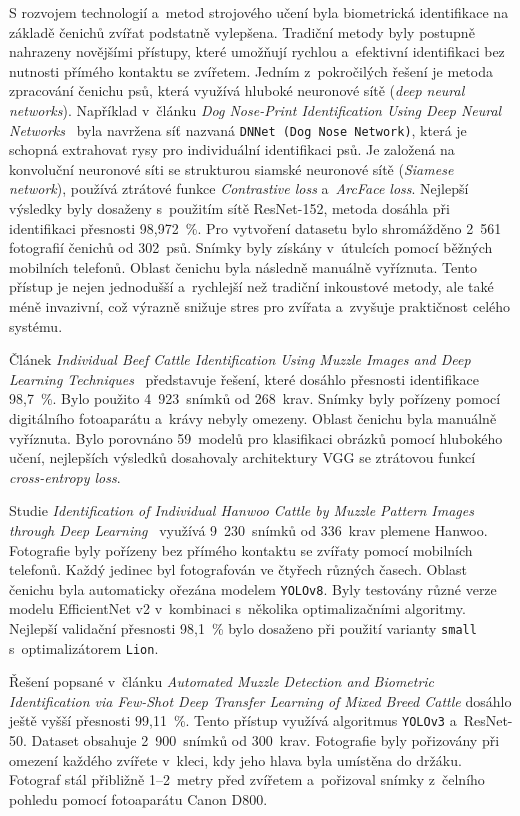 S rozvojem technologií a~metod strojového učení byla biometrická identifikace na základě čenichů zvířat podstatně vylepšena. Tradiční metody byly postupně nahrazeny novějšími přístupy, které umožňují rychlou a~efektivní identifikaci bez nutnosti přímého kontaktu se zvířetem. Jedním z~pokročilých řešení je metoda zpracování čenichu psů, která využívá hluboké neuronové sítě (\textit{deep neural networks}). Například v~článku \emph{Dog Nose-Print Identification Using Deep Neural Networks}~\cite{dog_nose_print} byla navržena síť nazvaná \texttt{DNNet (Dog Nose Network)}, která je schopná extrahovat rysy pro individuální identifikaci psů. Je založená na konvoluční neuronové síti se strukturou siamské neuronové sítě (\textit{Siamese network}), používá ztrátové funkce \textit{Contrastive loss} a~\textit{ArcFace loss}. Nejlepší výsledky byly dosaženy s~použitím sítě ResNet-152, metoda dosáhla při identifikaci přesnosti 98,972~\%.
Pro vytvoření datasetu bylo shromážděno 2~561 fotografií čenichů od 302~psů. Snímky byly získány v~útulcích pomocí běžných mobilních telefonů. Oblast čenichu byla následně manuálně vyříznuta. Tento přístup je nejen jednodušší a~rychlejší než tradiční inkoustové metody, ale také méně invazivní, což výrazně snižuje stres pro zvířata a~zvyšuje praktičnost celého systému.

Článek \emph{Individual Beef Cattle Identification Using Muzzle Images and Deep Learning Techniques}~\cite{VGG} představuje řešení, které dosáhlo přesnosti identifikace 98,7~\%. Bylo použito 4~923~snímků od 268~krav. Snímky byly pořízeny pomocí digitálního fotoaparátu a~krávy nebyly omezeny. Oblast čenichu byla manuálně vyříznuta. Bylo porovnáno 59~modelů pro klasifikaci obrázků pomocí hlubokého učení, nejlepších výsledků dosahovaly architektury VGG se ztrátovou funkcí \textit{cross-entropy loss}.

Studie \emph{Identification of Individual Hanwoo Cattle by Muzzle Pattern Images through Deep Learning}~\cite{Hanwoo} využívá 9~230~snímků od 336~krav plemene Hanwoo. Fotografie byly pořízeny bez přímého kontaktu se zvířaty pomocí mobilních telefonů. Každý jedinec byl fotografován ve čtyřech různých časech. Oblast čenichu byla automaticky ořezána modelem \texttt{YOLOv8}. Byly testovány různé verze modelu EfficientNet v2 v~kombinaci s~několika optimalizačními algoritmy. Nejlepší validační přesnosti 98,1~\% bylo dosaženo při použití varianty \texttt{small} s~optimalizátorem \texttt{Lion}.

Řešení popsané v~článku \emph{Automated Muzzle Detection and Biometric Identiﬁcation via Few-Shot Deep Transfer Learning of Mixed Breed Cattle} \cite{Few-Shot} dosáhlo ještě vyšší přesnosti 99,11~\%. Tento přístup využívá algoritmus \texttt{YOLOv3} a~ResNet-50. Dataset obsahuje 2~900~snímků od 300~krav. Fotografie byly pořizovány při omezení každého zvířete v~kleci, kdy jeho hlava byla umístěna do držáku. Fotograf stál přibližně 1--2~metry před zvířetem a~pořizoval snímky z~čelního pohledu pomocí fotoaparátu Canon D800.


